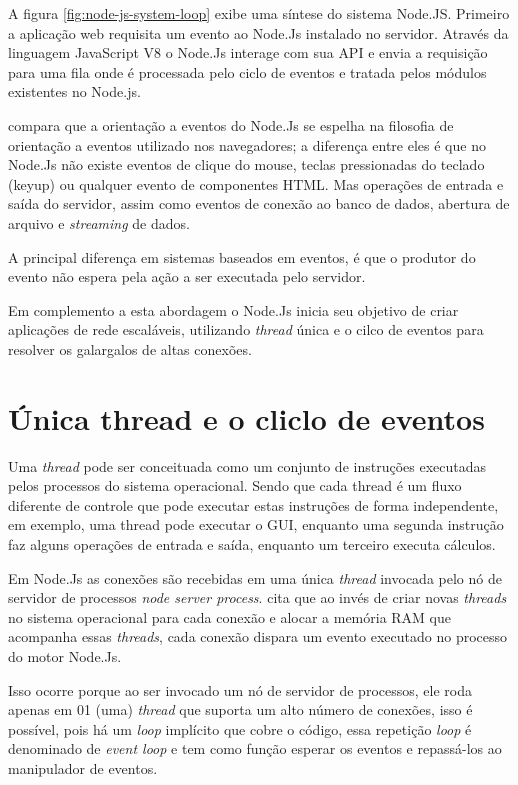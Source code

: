   A figura \ref{fig:node-js-system-loop} exibe uma síntese do sistema Node.JS. Primeiro a aplicação web requisita um evento 
  ao Node.Js instalado no servidor. Através da linguagem JavaScript V8 o Node.Js interage com sua \ac{API} e envia 
  a requisição para uma fila onde é processada pelo ciclo de eventos e tratada pelos módulos existentes no Node.js. 
  
   compara que a orientação a eventos do Node.Js se espelha na filosofia de orientação 
  a eventos utilizado nos navegadores; a diferença entre eles é que no Node.Js 
  não existe eventos de clique do mouse, teclas pressionadas do teclado (keyup) ou qualquer evento de componentes HTML. Mas operações
  de entrada e saída do servidor, assim como eventos de conexão ao banco de dados, abertura de arquivo e \textit{streaming}
  de dados.
  
  A principal diferença em sistemas baseados em eventos, é que o produtor do evento não espera pela ação a ser executada
  pelo servidor. \cite{Junior:2012}    

  Em complemento a esta abordagem o Node.Js inicia seu objetivo de criar aplicações de rede escaláveis, utilizando \textit{thread} única
  e o cilco de eventos para resolver os galargalos de altas conexões.

\section{Única thread e o cliclo de eventos}
\label{single-thread}

  Uma \textit{thread} pode ser conceituada como um conjunto de instruções executadas pelos processos do sistema operacional.
  Sendo que cada thread é um fluxo diferente de controle que pode executar estas instruções de forma independente, em exemplo,
  uma thread pode executar o GUI, enquanto uma segunda instrução faz alguns operações de entrada e saída, 
  enquanto um terceiro executa cálculos. \cite{Lewis:1995}
  
  Em Node.Js as conexões são recebidas em uma única \textit{thread} invocada pelo nó de servidor de processos \textit{node server process}.
   cita que ao invés de criar novas \textit{threads}
  no sistema operacional para cada conexão e alocar a memória RAM que acompanha essas \textit{threads}, 
  cada conexão dispara um evento executado no processo do motor Node.Js.
  
  Isso ocorre porque ao ser invocado um nó de servidor de processos, ele roda apenas em 01 (uma) 
  \textit{thread} que suporta um alto número de conexões, isso é possível, pois há um \textit{loop} implícito que cobre o código, 
  essa repetição \textit{loop} é denominado de \textit{event loop} e tem como função esperar os eventos e repassá-los 
  ao manipulador de eventos. \cite{Tilkov:2010}
  
